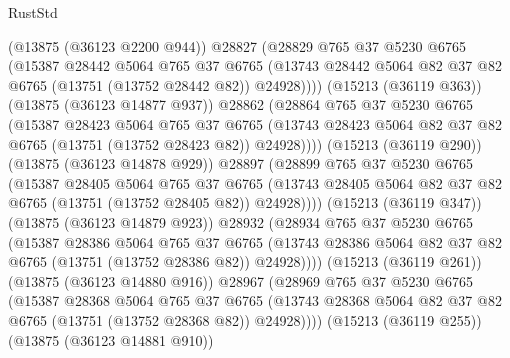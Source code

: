 \begin{lexlean}{RustStd}
\begin{coremodule}
                    (@13875 (@36123 @2200 @944))
                    @28827
                    (@28829
                      @765
                      @37
                      @5230
                      @6765
                      (@15387
                        @28442
                        @5064
                        @765
                        @37
                        @6765
                        (@13743
                          @28442
                          @5064
                          @82
                          @37
                          @82
                          @6765
                          (@13751 (@13752 @28442 @82))
                          @24928))))
                  (@15213 (@36119 @363))
                  (@13875 (@36123 @14877 @937))
                  @28862
                  (@28864
                    @765
                    @37
                    @5230
                    @6765
                    (@15387
                      @28423
                      @5064
                      @765
                      @37
                      @6765
                      (@13743 @28423 @5064 @82 @37 @82 @6765 (@13751 (@13752 @28423 @82)) @24928))))
                (@15213 (@36119 @290))
                (@13875 (@36123 @14878 @929))
                @28897
                (@28899
                  @765
                  @37
                  @5230
                  @6765
                  (@15387
                    @28405
                    @5064
                    @765
                    @37
                    @6765
                    (@13743 @28405 @5064 @82 @37 @82 @6765 (@13751 (@13752 @28405 @82)) @24928))))
              (@15213 (@36119 @347))
              (@13875 (@36123 @14879 @923))
              @28932
              (@28934
                @765
                @37
                @5230
                @6765
                (@15387
                  @28386
                  @5064
                  @765
                  @37
                  @6765
                  (@13743 @28386 @5064 @82 @37 @82 @6765 (@13751 (@13752 @28386 @82)) @24928))))
            (@15213 (@36119 @261))
            (@13875 (@36123 @14880 @916))
            @28967
            (@28969
              @765
              @37
              @5230
              @6765
              (@15387
                @28368
                @5064
                @765
                @37
                @6765
                (@13743 @28368 @5064 @82 @37 @82 @6765 (@13751 (@13752 @28368 @82)) @24928))))
          (@15213 (@36119 @255))
          (@13875 (@36123 @14881 @910))

\end{coremodule}
\end{lexlean}
